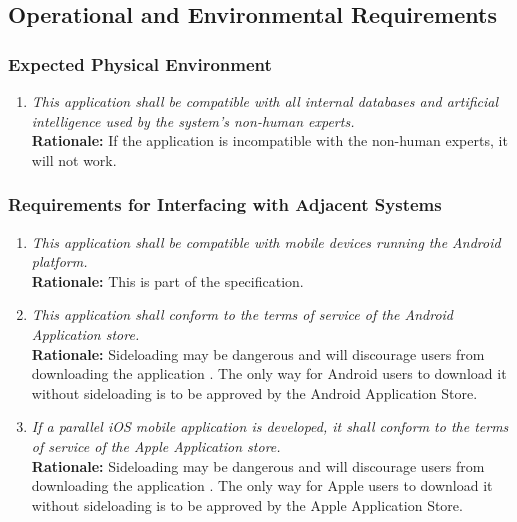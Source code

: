 \documentclass[]{article}
\begin{document}

\subsection{Operational and Environmental Requirements}
\label{sub:operational_and_environmental_requirements}

\subsubsection{Expected Physical Environment}
\label{ssub:expected_physical_environment}
\begin{enumerate}[{OE-EPE}1. ]
	\item \textit{This application shall be compatible with all internal databases and artificial intelligence used by the system's non-human experts.} \\ \textbf{Rationale:} If the application is incompatible with the non-human experts, it will not work.
\end{enumerate}

\subsubsection{Requirements for Interfacing with Adjacent Systems}
\label{ssub:requirements_for_interfacing_with_adjacent_systems}
\begin{enumerate}[{OE-IA}1. ]
	\item \textit{This application shall be compatible with mobile devices running the Android platform.} \\ \textbf{Rationale:} This is part of the specification.
        \item \textit{This application shall conform to the terms of service of the Android Application store.} \\ \textbf{Rationale:} Sideloading may be dangerous and will discourage users from downloading the application \cite{Trio}. The only way for Android users to download it without sideloading is to be approved by the Android Application Store.
        \item \textit{If a parallel iOS mobile application is developed, it shall conform to the terms of service of the Apple Application store.} \\ \textbf{Rationale:} Sideloading may be dangerous and will discourage users from downloading the application \cite{Trio}. The only way for Apple users to download it without sideloading is to be approved by the Apple Application Store.
    
\end{enumerate}
\end{document}
